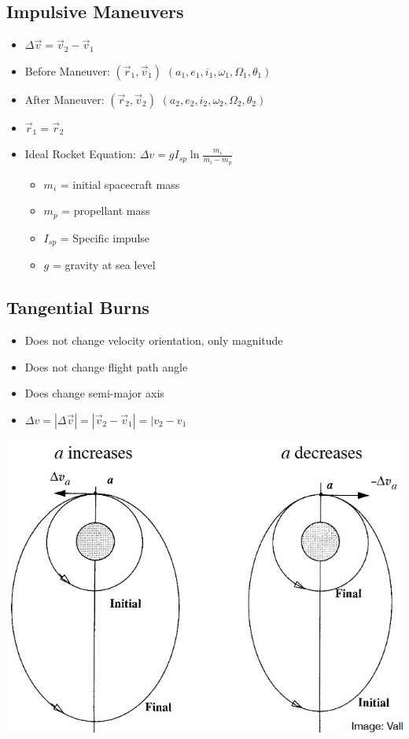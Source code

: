 \documentclass{article}
\begin{document}
\begin{multicols*}{3}
    \subsection*{Impulsive Maneuvers}
    \begin{itemize}
        \item $\Delta\vec{v}=\vec{v}_2-\vec{v}_1$
        \item Before Maneuver: $(\vec{r}_1,\vec{v}_1)$ $(a_1,e_1,i_1,\omega_1,\Omega_1,\theta_1)$
        \item After Maneuver: $(\vec{r}_2,\vec{v}_2)$ $(a_2,e_2,i_2,\omega_2,\Omega_2,\theta_2)$
        \item $\vec{r}_1=\vec{r}_2$
        \item Ideal Rocket Equation: $\Delta v=gI_{sp}\ln{\frac{m_i}{m_i-m_p}}$
            \begin{itemize}
                \item $m_i$ = initial spacecraft mass
                \item $m_p$ = propellant mass
                \item $I_{sp}$ = Specific impulse
                \item $g$ = gravity at sea level
            \end{itemize}
    \end{itemize}
    \subsection*{Tangential Burns}
    \begin{itemize}
        \item Does not change velocity orientation, only magnitude
        \item Does not change flight path angle
        \item Does change semi-major axis
        \item $\Delta v = |\Delta\vec{v}|=|\vec{v}_2-\vec{v}_1|=|v_2-v_1$
    \end{itemize}
    \includegraphics[width=\linewidth]{Figures/tangential_burn.png}

\end{multicols*}
\end{document}
